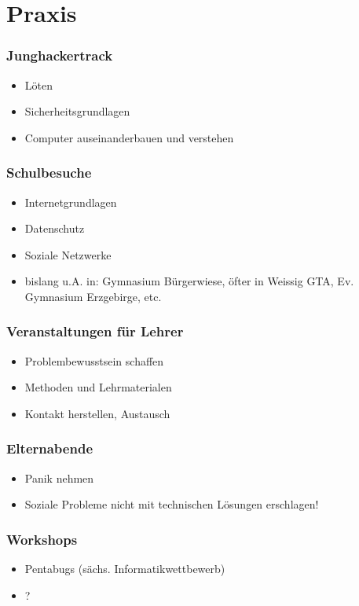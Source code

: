 \documentclass[12pt]{beamer}
\begin{document}
\section{Praxis}

\begin{frame}
  \frametitle{Junghackertrack}
  \begin{itemize}
    \item Löten
    \item Sicherheitsgrundlagen
    \item Computer auseinanderbauen und verstehen
  \end{itemize}
\end{frame}

\begin{frame}
  \frametitle{Schulbesuche}
  \begin{itemize}
    \item Internetgrundlagen
    \item Datenschutz
    \item Soziale Netzwerke
    \item bislang u.A. in: Gymnasium Bürgerwiese, öfter in Weissig GTA, Ev. Gymnasium Erzgebirge, etc.
  \end{itemize}
\end{frame}

\begin{frame}
  \frametitle{Veranstaltungen für Lehrer}
  \begin{itemize}
    \item Problembewusstsein schaffen
    \item Methoden und Lehrmaterialen
    \item Kontakt herstellen, Austausch
  \end{itemize}
\end{frame}

\begin{frame}
  \frametitle{Elternabende}
  \begin{itemize}
    \item Panik nehmen
    \item Soziale Probleme nicht mit technischen Lösungen erschlagen!
  \end{itemize}
\end{frame}

\begin{frame}
  \frametitle{Workshops}
  \begin{itemize}
    \item Pentabugs (sächs. Informatikwettbewerb)
    \item ?
  \end{itemize}
\end{frame}
\end{document}
